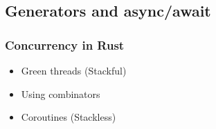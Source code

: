 \subsection{Generators and async/await} %
\begin{frame}[fragile]
    \frametitle{Concurrency in Rust}
% 
% 
% 
% 
    \begin{itemize}
        \item Green threads (Stackful) 
        \item Using combinators
        \item Coroutines (Stackless)
    \end{itemize}
% 
\end{frame}

